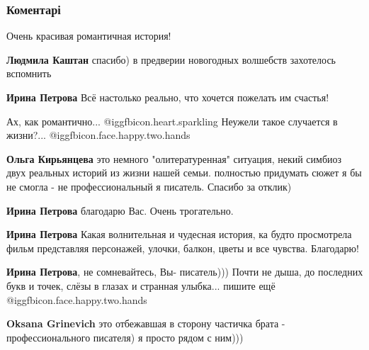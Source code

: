  
 
 
 
 
\subsubsection{Коментарі}
\label{sec:07_12_2020.fb.fb_group.story_kiev_ua.2.magia_chisel.cmt}

\begin{itemize} %
Очень красивая романтичная история!

\begin{itemize} %
\textbf{Людмила Каштан} спасибо) в предверии новогодных волшебств захотелось вспомнить

\textbf{Ирина Петрова} Всё настолько реально, что хочется пожелать им счастья!
\end{itemize} %

Ах, как романтично... @igg{fbicon.heart.sparkling} 
Неужели такое случается в жизни?... @igg{fbicon.face.happy.two.hands} 

\begin{itemize} %
\textbf{Ольга Кирьянцева} это немного "олитературенная" ситуация, некий симбиоз двух реальных историй из жизни нашей семьи. полностью придумать сюжет я бы не смогла - не профессиональный я писатель. Спасибо за отклик)

\textbf{Ирина Петрова} благодарю Вас. Очень трогательно.

\textbf{Ирина Петрова} Какая волнительная и чудесная история, ка будто просмотрела фильм представляя персонажей, улочки, балкон, цветы и все чувства. Благодарю!

\textbf{Ирина Петрова}, не сомневайтесь, Вы- писатель))) Почти не дыша, до последних букв и точек, слёзы в глазах и странная улыбка... пишите ещё @igg{fbicon.face.happy.two.hands} 

\textbf{Oksana Grinevich} это отбежавшая в сторону частичка брата - профессионального писателя) я просто рядом с ним)))


\end{itemize}
\end{itemize}
